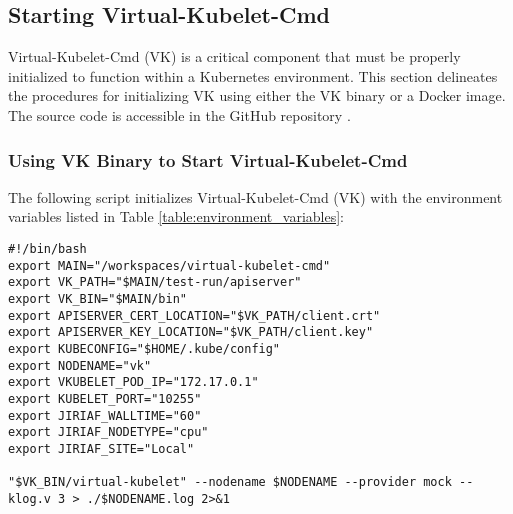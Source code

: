 \subsection{Starting Virtual-Kubelet-Cmd}
Virtual-Kubelet-Cmd (VK) is a critical component that must be properly initialized to function within a Kubernetes environment. This section delineates the procedures for initializing VK using either the VK binary or a Docker image. The source code is accessible in the GitHub repository \cite{virtual-kubelet-cmd}.

\subsubsection{Using VK Binary to Start Virtual-Kubelet-Cmd}

The following script initializes Virtual-Kubelet-Cmd (VK) with the environment variables listed in Table \ref{table:environment_variables}:

\begin{verbatim}
#!/bin/bash
export MAIN="/workspaces/virtual-kubelet-cmd"
export VK_PATH="$MAIN/test-run/apiserver"
export VK_BIN="$MAIN/bin"
export APISERVER_CERT_LOCATION="$VK_PATH/client.crt"
export APISERVER_KEY_LOCATION="$VK_PATH/client.key"
export KUBECONFIG="$HOME/.kube/config"
export NODENAME="vk"
export VKUBELET_POD_IP="172.17.0.1"
export KUBELET_PORT="10255"
export JIRIAF_WALLTIME="60"
export JIRIAF_NODETYPE="cpu"
export JIRIAF_SITE="Local"

"$VK_BIN/virtual-kubelet" --nodename $NODENAME --provider mock --klog.v 3 > ./$NODENAME.log 2>&1
\end{verbatim}

